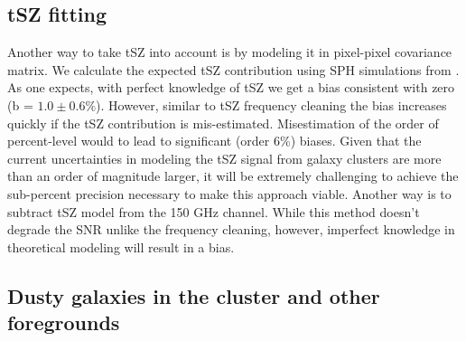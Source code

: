  \subsection{tSZ fitting}
 Another way to take tSZ into account is by modeling it in pixel-pixel covariance matrix.
 We calculate the expected tSZ contribution using SPH simulations from \citet{mccarthy13}.
As one expects, with perfect knowledge of tSZ we get a bias consistent with zero (b = $1.0 \pm 0.6\%$).
However, similar to tSZ frequency cleaning the bias increases quickly if the tSZ contribution is mis-estimated.
Misestimation of the order of percent-level would to lead to significant (order 6\%) biases.
Given that the current uncertainties in modeling the tSZ signal from galaxy clusters are more than an order of magnitude larger, it will be extremely challenging to achieve the sub-percent precision necessary to make this approach viable.
Another way is to subtract tSZ model from the 150 GHz channel.
 While this method doesn't degrade the SNR unlike the frequency cleaning, however, imperfect knowledge in theoretical modeling will result in a bias.
 
 
 
 \subsection{Dusty galaxies in the cluster and other foregrounds}
\label{sec_DG_sys_bias}


